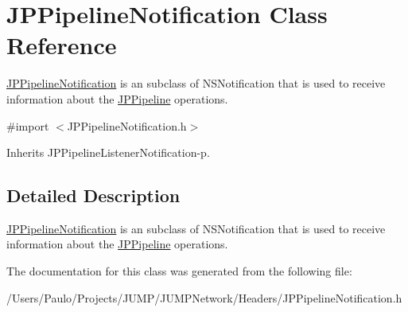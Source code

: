 \hypertarget{a00032}{
\section{JPPipelineNotification Class Reference}
\label{a00032}
}


\hyperlink{a00032}{JPPipelineNotification} is an subclass of {\ttfamily NSNotification} that is used to receive information about the \hyperlink{a00019}{JPPipeline} operations.  




{\ttfamily \#import $<$JPPipelineNotification.h$>$}



Inherits JPPipelineListenerNotification-\/p.



\subsection{Detailed Description}
\hyperlink{a00032}{JPPipelineNotification} is an subclass of {\ttfamily NSNotification} that is used to receive information about the \hyperlink{a00019}{JPPipeline} operations. 

The documentation for this class was generated from the following file:\begin{DoxyCompactItemize}
\item 
/Users/Paulo/Projects/JUMP/JUMPNetwork/Headers/JPPipelineNotification.h\end{DoxyCompactItemize}

